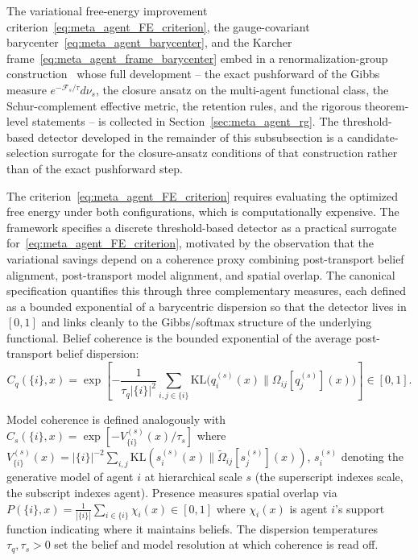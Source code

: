 \documentclass[11pt]{article}
\begin{document}
The variational free-energy improvement criterion~\eqref{eq:meta_agent_FE_criterion}, the gauge-covariant barycenter~\eqref{eq:meta_agent_barycenter}, and the Karcher frame~\eqref{eq:meta_agent_frame_barycenter} embed in a renormalization-group construction~\cite{Wilson1971, Cardy1996} whose full development -- the exact pushforward of the Gibbs measure $e^{-\mathcal{F}_s/\tau} d\nu_s$, the closure ansatz on the multi-agent functional class, the Schur-complement effective metric, the retention rules, and the rigorous theorem-level statements -- is collected in Section~\ref{sec:meta_agent_rg}. The threshold-based detector developed in the remainder of this subsubsection is a candidate-selection surrogate for the closure-ansatz conditions of that construction rather than of the exact pushforward step.

The criterion~\eqref{eq:meta_agent_FE_criterion} requires evaluating the optimized free energy under both configurations, which is computationally expensive. The framework specifies a discrete threshold-based detector as a practical surrogate for~\eqref{eq:meta_agent_FE_criterion}, motivated by the observation that the variational savings depend on a coherence proxy combining post-transport belief alignment, post-transport model alignment, and spatial overlap. The canonical specification quantifies this through three complementary measures, each defined as a bounded exponential of a barycentric dispersion so that the detector lives in $[0, 1]$ and links cleanly to the Gibbs/softmax structure of the underlying functional. Belief coherence is the bounded exponential of the average post-transport belief dispersion:
\begin{equation}
C_q(\{i\}, x) = \exp\left[-\frac{1}{\tau_q |\{i\}|^2}\sum_{i,j \in \{i\}} \mathrm{KL}\big(q_i^{(s)}(x) \| \Omega_{ij}[q_j^{(s)}](x)\big)\right] \in [0, 1].
\end{equation}

Model coherence is defined analogously with $C_s(\{i\}, x) = \exp[-V^{(s)}_{\{i\}}(x)/\tau_s]$ where $V^{(s)}_{\{i\}}(x) = |\{i\}|^{-2}\sum_{i,j} \mathrm{KL}(s_i^{(s)}(x) \| \tilde{\Omega}_{ij}[s_j^{(s)}](x))$, $s_i^{(s)}$ denoting the generative model of agent $i$ at hierarchical scale $s$ (the superscript indexes scale, the subscript indexes agent). Presence measures spatial overlap via $P(\{i\}, x) = \frac{1}{|\{i\}|}\sum_{i \in \{i\}} \chi_i(x) \in [0, 1]$ where $\chi_i(x)$ is agent $i$'s support function indicating where it maintains beliefs. The dispersion temperatures $\tau_q, \tau_s > 0$ set the belief and model resolution at which coherence is read off.
\end{document}
